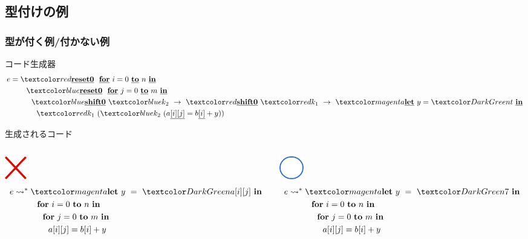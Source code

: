 
\subsection{型付けの例}

\begin{frame}
  \frametitle{型が付く例/付かない例}
  コード生成器
  \begin{align*}
    e & = \red{\cResetz} ~~\cforin{i = 0}{n} \\
      & \phantom{=}~~~~\blue{\cResetz} ~~\cforin{j = 0}{m} \\
      & \phantom{=}~~~~~~ \blue{\cShiftz}~\blue{k_2}~\to~ \red{\cShiftz}~\red{k_1}~\to~ \magenta{\cLet~y=\green{t}~\cIn} \\
      & \phantom{=}~~~~~~~~ \red{k_1}~(\blue{k_2}~(a\cArrays{i}{j} = b\cArray{i} + y))
  \end{align*}

  \pause
  生成されるコード
  \begin{columns}
    \begin{column}{0.5\textwidth}%
      \center
      \includegraphics[clip,height=1cm]{./img/batsu.png}
      \begin{align*}
        e & \too \magenta{\Let ~y ~= ~\green{a[i][j]} ~\In} \\
          & \phantom{\too}~~~~ \forin{i = 0}{n} \\
          & \phantom{\too}~~~~~~\forin{j = 0}{m} \\
          & \phantom{\too}~~~~~~~~a[i][j] = b[i] + y \\
      \end{align*}
    \end{column}

    \begin{column}{0.5\textwidth}%
      \center
      \includegraphics[height=1cm]{./img/maru.png}
      \begin{align*}
        e & \too \magenta{\Let ~y ~= ~\green{7} ~\In} \\
          & \phantom{\too}~~~~ \forin{i = 0}{n} \\
          & \phantom{\too}~~~~~~\forin{j = 0}{m} \\
          & \phantom{\too}~~~~~~~~a[i][j] = b[i] + y \\
      \end{align*}
    \end{column}
  \end{columns}
\end{frame}

